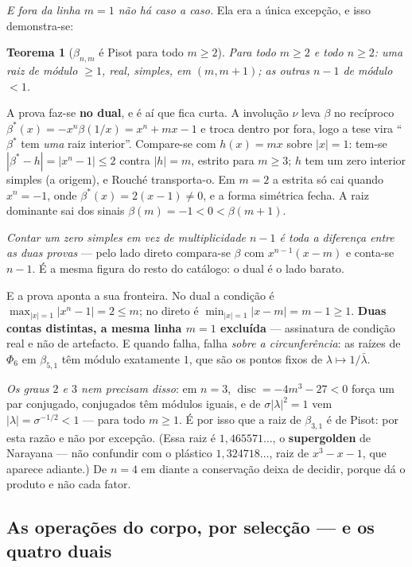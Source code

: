 \documentclass[11pt]{article}
\theoremstyle{plain}
\newtheorem{teorema}{Teorema}
\theoremstyle{remark}
\begin{document}
\begin{itemize}
\emph{E fora da linha $m=1$ não há caso a caso.} Ela era a única excepção, e isso demonstra-se:

\begin{teorema}[$\beta_{n,m}$ é Pisot para todo $m\geq2$]\label{thm:pisot-cat}
Para todo $m\geq2$ e todo $n\geq2$: uma raiz de módulo $\geq1$, real, simples, em $(m,m+1)$; as
outras $n-1$ de módulo $<1$.
\end{teorema}

\noindent A prova faz-se \textbf{no dual}, e é aí que fica curta. A involução $\nu$ leva $\beta$ no
recíproco $\beta^*(x) = -x^n\beta(1/x) = x^n+mx-1$ e troca dentro por fora, logo a tese vira
``$\beta^*$ tem \emph{uma} raiz interior''. Compare-se com $h(x) = mx$ sobre $|x|=1$: tem-se
$|\beta^*-h| = |x^n-1| \leq 2$ contra $|h| = m$, estrito para $m\geq3$; $h$ tem um zero interior
simples (a origem), e Rouché transporta-o. Em $m=2$ a estrita só cai quando $x^n=-1$, onde
$\beta^*(x) = 2(x-1)\neq0$, e a forma simétrica fecha. A raiz dominante sai dos sinais
$\beta(m) = -1 < 0 < \beta(m+1)$.

\emph{Contar um zero simples em vez de multiplicidade $n-1$ é toda a diferença entre as duas
provas} --- pelo lado direto compara-se $\beta$ com $x^{n-1}(x-m)$ e conta-se $n-1$. É a mesma
figura do resto do catálogo: o dual é o lado barato.

E a prova aponta a sua fronteira. No dual a condição é $\max_{|x|=1}|x^n-1| = 2 \leq m$; no direto
é $\min_{|x|=1}|x-m| = m-1 \geq 1$. \textbf{Duas contas distintas, a mesma linha $m=1$ excluída} ---
assinatura de condição real e não de artefacto. E quando falha, falha \emph{sobre a
circunferência}: as raízes de $\Phi_6$ em $\beta_{5,1}$ têm módulo exatamente $1$, que são os
pontos fixos de $\lambda\mapsto1/\bar\lambda$.

\emph{Os graus $2$ e $3$ nem precisam disso}: em $n=3$, $\operatorname{disc} = -4m^3-27<0$ força um
par conjugado, conjugados têm módulos iguais, e de $\sigma|\lambda|^2=1$ vem $|\lambda| =
\sigma^{-1/2}<1$ --- para todo $m\geq1$. É por isso que a raiz de $\beta_{3,1}$ é de Pisot: por
esta razão e não por excepção. (Essa raiz é $1{,}465571\ldots$, o \textbf{supergolden} de Narayana
--- não confundir com o plástico $1{,}324718\ldots$, raiz de $x^3-x-1$, que aparece adiante.) De $n=4$ em diante a conservação deixa de decidir, porque dá o produto e
não cada fator.


\subsection{As operações do corpo, por selecção --- e os quatro duais}


\end{itemize}
\end{document}
